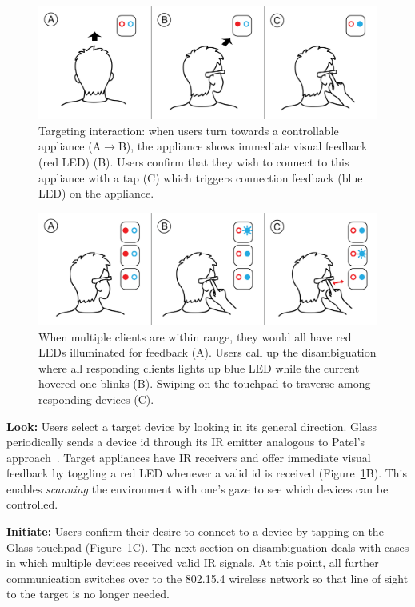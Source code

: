 \begin{figure}[t!]
\centering
\includegraphics[width=\columnwidth]{figures/stepbystep.png}
\caption{Targeting interaction: when users turn towards a controllable appliance (A$\rightarrow$B), the appliance shows immediate visual feedback (red LED) (B). Users confirm that they wish to connect to this appliance with a tap (C) which triggers connection feedback (blue LED) on the appliance.}
\label{fig:interaction}
\end{figure}

\begin{figure}[t!]
\centering
\includegraphics[width=\columnwidth]{figures/stepbystep_multi.png}
\caption{When multiple clients are within range, they would all have red LEDs illuminated for feedback (A). Users call up the disambiguation where all responding clients lights up blue LED while the current hovered one blinks (B). Swiping on the touchpad to traverse among responding devices (C).}
\label{fig:interaction_multi}
\end{figure}

{\bf Look:} Users select a target device by looking in its general direction.
Glass periodically sends a device id through its IR emitter analogous to Patel's approach~\cite{patel_2-way_2003}. Target appliances have IR receivers and offer immediate visual feedback by toggling a red LED whenever a valid id is received (Figure~\ref{fig:interaction}B). This enables {\em scanning} the environment with one's gaze to see which devices can be controlled.

{\bf Initiate:} Users confirm their desire to connect to a device by tapping on the Glass touchpad (Figure~\ref{fig:interaction}C). The next section on disambiguation deals with cases in which multiple devices received valid IR signals. At this point, all further communication switches over to the 802.15.4 wireless network so that line of sight to the target is no longer needed.

